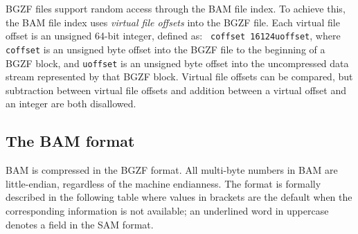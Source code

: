 \documentclass[10pt]{article}
\begin{document}
BGZF files support random access through the BAM file index. To achieve
this, the BAM file index uses \emph{virtual file offsets} into the BGZF
file. Each virtual file offset is an unsigned 64-bit integer, defined as: {\tt
  coffset 16\char124uoffset}, where {\tt coffset} is an
unsigned byte offset into the BGZF file to the beginning of a BGZF
block, and {\tt uoffset} is an unsigned byte offset into the
uncompressed data stream represented by that BGZF block. Virtual file
offsets can be compared, but subtraction between virtual file offsets
and addition between a virtual offset and an integer are both
disallowed.

\subsection{The BAM format}
BAM is compressed in the BGZF format. All multi-byte numbers in BAM are
little-endian, regardless of the machine endianness. The format is
formally described in the following table where values in brackets are
the default when the corresponding information is not available; an
underlined word in uppercase denotes a field in the SAM format.
\end{document}
